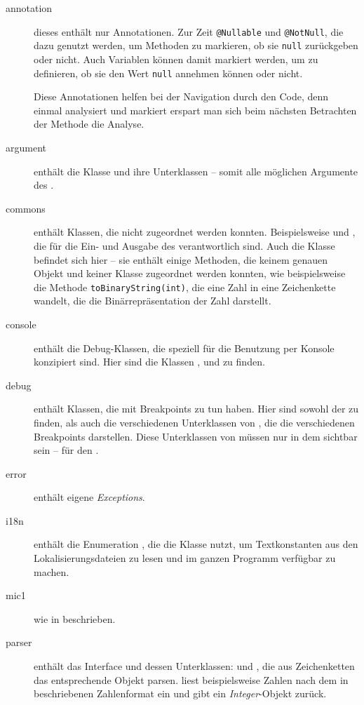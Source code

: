 \begin{description}
\item[annotation] dieses \package enthält nur Annotationen. Zur Zeit \texttt{@Nullable} und \texttt{@NotNull}, die dazu genutzt werden, um Methoden zu markieren, ob sie \texttt{null} zurückgeben oder nicht. Auch Variablen können damit markiert werden, um zu definieren, ob sie den Wert \texttt{null} annehmen können oder nicht.

Diese Annotationen helfen bei der Navigation durch den Code, denn einmal analysiert und markiert erspart man sich beim nächsten Betrachten der Methode die Analyse.
\item[argument] enthält die Klasse  und ihre Unterklassen -- somit alle möglichen Argumente des \md.
\item[commons] enthält Klassen, die nicht zugeordnet werden konnten. Beispielsweise  und , die für die Ein- und Ausgabe des \md verantwortlich sind. Auch die Klasse  befindet sich hier -- sie enthält einige Methoden, die keinem genauen Objekt und keiner Klasse zugeordnet werden konnten, wie beispielsweise die Methode \texttt{toBinaryString(int)}, die eine Zahl in eine Zeichenkette wandelt, die die Binärrepräsentation der Zahl darstellt.
\item[console] enthält die Debug-Klassen, die speziell für die Benutzung per Konsole konzipiert sind. Hier sind die Klassen ,  und  zu finden.
\item[debug] enthält Klassen, die mit Breakpoints zu tun haben. Hier sind sowohl der  zu finden, als auch die verschiedenen Unterklassen von , die die verschiedenen Breakpoints darstellen. Diese Unterklassen von  müssen nur in dem \package sichtbar sein -- für den .
\item[error] enthält eigene \emph{Exceptions}.
\item[i18n] enthält die Enumeration , die die Klasse  nutzt, um Textkonstanten aus den Lokalisierungsdateien zu lesen und im ganzen Programm verfügbar zu machen.
\item[mic1] wie in  beschrieben.
\item[parser] enthält das Interface  und dessen Unterklassen:  und , die aus Zeichenketten das entsprechende Objekt parsen.  liest beispielsweise Zahlen nach dem in  beschriebenen Zahlenformat ein und gibt ein \emph{Integer}-Objekt zurück.

\end{description}
